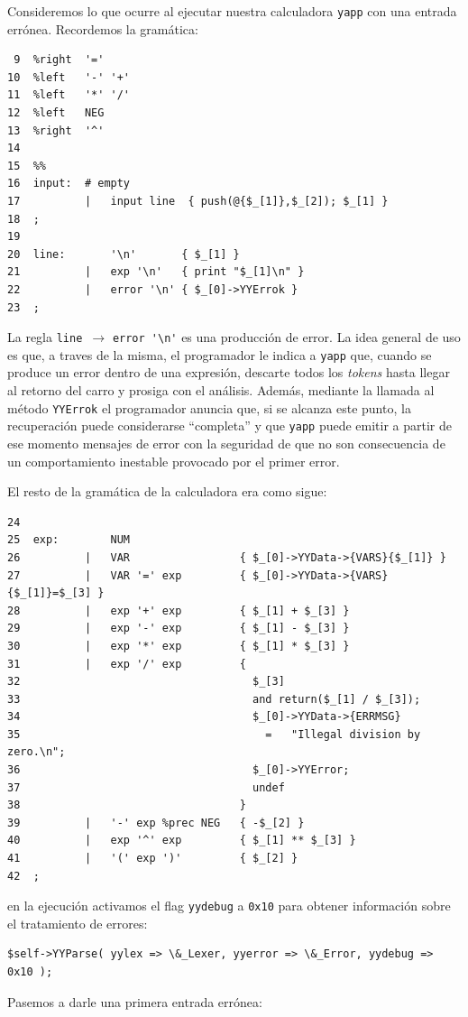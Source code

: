 Consideremos lo que ocurre al ejecutar nuestra calculadora
\verb|yapp| con una entrada errónea. Recordemos 
la gramática:

\begin{verbatim}
 9  %right  '='
10  %left   '-' '+'
11  %left   '*' '/'
12  %left   NEG
13  %right  '^'
14
15  %%
16  input:  # empty
17          |   input line  { push(@{$_[1]},$_[2]); $_[1] }
18  ;
19
20  line:       '\n'       { $_[1] }
21          |   exp '\n'   { print "$_[1]\n" }
22          |   error '\n' { $_[0]->YYErrok }
23  ;
\end{verbatim}

La regla \verb|line |$\rightarrow$ \verb|error '\n'| es una producción de
error. La idea general de uso es que, a traves de la misma, el programador 
le indica a \verb|yapp| que, cuando se produce un error
dentro de una expresión, descarte todos los \emph{tokens} hasta llegar al
retorno del carro y prosiga con el análisis. 
Además, mediante la llamada al método \verb|YYErrok| el programador
anuncia que, si se alcanza este punto, la recuperación puede considerarse 
``completa''  y que \verb|yapp| puede emitir a partir de ese momento 
mensajes de error
con la seguridad de que no son consecuencia de un comportamiento inestable
provocado por el primer error.

El resto de la gramática de la calculadora era como sigue:

\begin{verbatim}
24
25  exp:        NUM
26          |   VAR                 { $_[0]->YYData->{VARS}{$_[1]} }
27          |   VAR '=' exp         { $_[0]->YYData->{VARS}{$_[1]}=$_[3] }
28          |   exp '+' exp         { $_[1] + $_[3] }
29          |   exp '-' exp         { $_[1] - $_[3] }
30          |   exp '*' exp         { $_[1] * $_[3] }
31          |   exp '/' exp         {
32                                    $_[3]
33                                    and return($_[1] / $_[3]);
34                                    $_[0]->YYData->{ERRMSG}
35                                      =   "Illegal division by zero.\n";
36                                    $_[0]->YYError;
37                                    undef
38                                  }
39          |   '-' exp %prec NEG   { -$_[2] }
40          |   exp '^' exp         { $_[1] ** $_[3] }
41          |   '(' exp ')'         { $_[2] }
42  ;
\end{verbatim}
en la ejecución activamos el flag \verb|yydebug| a \verb|0x10| para 
obtener información sobre el tratamiento de errores:
\begin{verbatim}
$self->YYParse( yylex => \&_Lexer, yyerror => \&_Error, yydebug => 0x10 );
\end{verbatim}
Pasemos a darle una primera entrada errónea:


